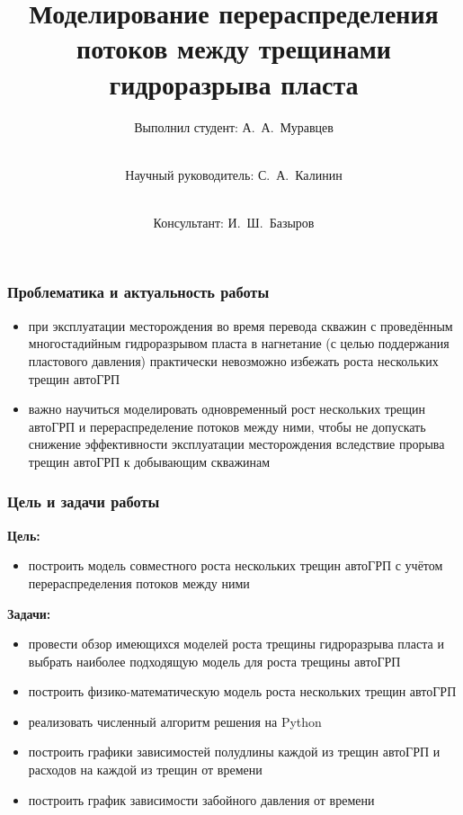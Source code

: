 \documentclass{beamer}
\title{Моделирование перераспределения потоков между трещинами гидроразрыва пласта}
\subtitle{}
\author{Выполнил студент: А.~А.~Муравцев\and \\Научный руководитель: С.~А.~Калинин\and \\Консультант: И.~Ш.~Базыров}
\begin{document}
\begin{frame}
\titlepage
\end{frame}


\begin{frame}
\frametitle{Проблематика и актуальность работы}
\begin{itemize}
	\item при эксплуатации месторождения во время перевода скважин с проведённым многостадийным гидроразрывом пласта в нагнетание (с целью поддержания пластового давления) практически невозможно избежать роста нескольких трещин автоГРП
	\item важно научиться моделировать одновременный рост нескольких трещин автоГРП и перераспределение потоков между ними, чтобы не допускать снижение эффективности эксплуатации месторождения вследствие прорыва трещин автоГРП к добывающим скважинам 
\end{itemize}
\end{frame}


\begin{frame}
\frametitle{Цель и задачи работы}

\textbf{Цель:}
\begin{itemize}
	\item построить модель совместного роста нескольких трещин автоГРП с учётом перераспределения потоков между ними
\end{itemize}

\textbf{Задачи:}
\begin{itemize}
	\item провести обзор имеющихся моделей роста трещины гидроразрыва пласта и выбрать наиболее подходящую модель для роста трещины автоГРП
	\item построить физико-математическую модель роста нескольких трещин автоГРП
	\item реализовать численный алгоритм решения на Python
	\item построить графики зависимостей полудлины каждой из трещин автоГРП и расходов на каждой из трещин от времени
	\item построить график зависимости забойного давления от времени
\end{itemize}

\end{frame}
\end{document}
